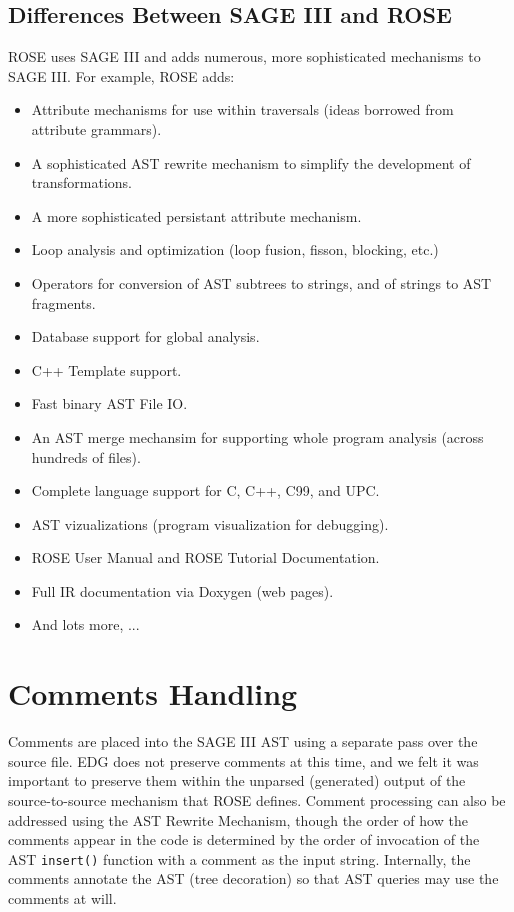 \subsection{Differences Between SAGE III and ROSE}
   ROSE uses SAGE III and adds numerous, more sophisticated mechanisms to SAGE III.
For example, ROSE adds:
\begin{itemize}
    \item Attribute mechanisms for use within traversals (ideas borrowed 
          from attribute grammars).
    \item A sophisticated AST rewrite mechanism to simplify the development 
          of transformations.
    \item A more sophisticated persistant attribute mechanism.
    \item Loop analysis and optimization (loop fusion, fisson, blocking, etc.)
    \item Operators for conversion of AST subtrees to strings, and of strings 
          to AST fragments.
    \item Database support for global analysis.
    \item C++ Template support.
    \item Fast binary AST File I\/O.
    \item An AST merge mechansim for supporting whole program analysis
          (across hundreds of files).
    \item Complete language support for C, C++, C99, and UPC.
    \item AST vizualizations (program visualization for debugging).
    \item ROSE User Manual and ROSE Tutorial Documentation.
    \item Full IR documentation via Doxygen (web pages).
    \item And lots more, ...
\end{itemize}

\section {Comments Handling}

    Comments are placed into the SAGE III AST using a separate pass over the source file.
EDG does not preserve comments at this time, and we felt it was important to preserve them
within the unparsed (generated) output of the source-to-source mechanism that ROSE defines.
Comment processing can also be addressed using the AST Rewrite Mechanism, though
the order of how the comments appear in the code is determined by the order of 
invocation of the AST {\tt insert()} function with a comment as the input string.
Internally, the comments annotate the AST (tree decoration) so that AST queries may use 
the comments at will.

